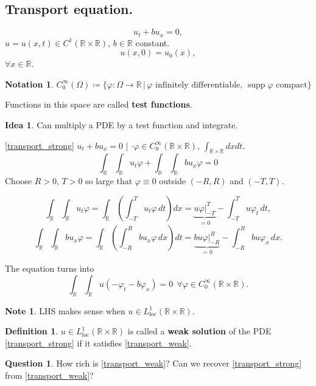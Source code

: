 \documentclass[12pt]{article}
\DeclareMathOperator{\supp}{supp}
\theoremstyle{definition}
\newtheorem*{definition*}{Definition}
\newtheorem*{notation}{Notation}
\newtheorem*{note}{Note}
\newtheorem*{idea}{Idea}
\newtheorem*{question}{Question}
\begin{document}
\subsection*{Transport equation.}
\begin{equation}\tag{T}\label{transport_strong}
u_t+bu_x=0,
\end{equation}
$u=u(x,t)\in C^1(\mathbb R\times\mathbb R)$, $b\in\mathbb R$ constant.
\begin{equation}\tag{IC}
u(x,0)=u_0(x),
\end{equation}
$\forall x\in\mathbb R$.

\begin{notation}
$C_0^\infty(\Omega)\coloneqq\{\varphi:\Omega\rightarrow\mathbb R\,|\,\varphi\text{ infinitely differentiable},\,\supp\varphi\text{ compact}\}$
\end{notation}

Functions in this space are called \textbf{test functions}.

\begin{idea}
Can multiply a PDE by a test function and integrate.
\end{idea}

\eqref{transport_strong} $u_t+bu_x=0$ | $\cdot\varphi\in C_0^\infty(\mathbb R\times\mathbb R)$, $\int_{\mathbb R\times\mathbb R}dxdt$.
\[\int_\mathbb R\int_\mathbb Ru_t\varphi+\int_\mathbb R\int_\mathbb Rbu_x\varphi=0\]
Choose $R>0$, $T>0$ so large that $\varphi\equiv0$ outside $(-R,R)$ and $(-T,T)$.

\[\int_\mathbb R\int_\mathbb Ru_t\varphi=\int_\mathbb R\left(\int_{-T}^Tu_t\varphi\,dt\right)dx=\underbrace{u\varphi\Big|_{-T}^T}_{=0}-\int_{-T}^Tu\varphi_t\,dt,\]
\[\int_\mathbb R\int_\mathbb Rbu_x\varphi=\int_\mathbb R\left(\int_{-R}^Rbu_x\varphi\,dx\right)dt=\underbrace{bu\varphi\Big|_{-R}^R}_{=0}-\int_{-R}^Rbu\varphi_x\,dx.\]

The equation turns into
\begin{equation}\tag{T$'$}\label{transport_weak}
\int_\mathbb R\int_\mathbb Ru(-\varphi_t-b\varphi_x)=0\ \ \forall\varphi\in C_0^\infty(\mathbb R\times\mathbb R).
\end{equation}

\begin{note}
LHS makes sense when $u\in L_\text{loc}^1(\mathbb R\times\mathbb R)$.
\end{note}

\begin{definition*}
$u\in L_\text{loc}^1(\mathbb R\times\mathbb R)$ is called a \textbf{weak solution} of the PDE \eqref{transport_strong} if it satisfies \eqref{transport_weak}.
\end{definition*}
\begin{question}How rich is \eqref{transport_weak}? Can we recover \eqref{transport_strong} from \eqref{transport_weak}?
\end{question}
\end{document}
